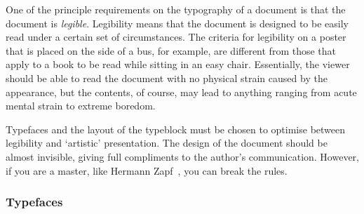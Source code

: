\documentclass[10pt,a4paper,oneside,extrafontsizes]{memoir}%
\begin{document}
\begin{paracol}{2}
\switchEng
    One of the principle requirements on the typography of a document is 
that the document is \emph{legible}. Legibility 
means that the document 
is designed to be easily read under a certain set of circumstances. 
The criteria for
legibility on a poster that is placed on the side of a bus, for example, are
different from those that apply to a book to be read while sitting in an
easy chair. Essentially, the viewer should be able to read the document
with no physical strain caused by the appearance, but the contents, 
of course, may lead to anything ranging from acute mental strain to 
extreme boredom.

    Typefaces and the layout of the 
typeblock must be 
chosen to optimise between legibility and `artistic' presentation. 
The design of the document should be almost invisible, giving full 
compliments to the author's communication. However, if you are a master, 
like Hermann Zapf~\autocite{ZAPF00}, you can break the rules.
\end{paracol}


\subsubsection{Typefaces}
\end{document}
